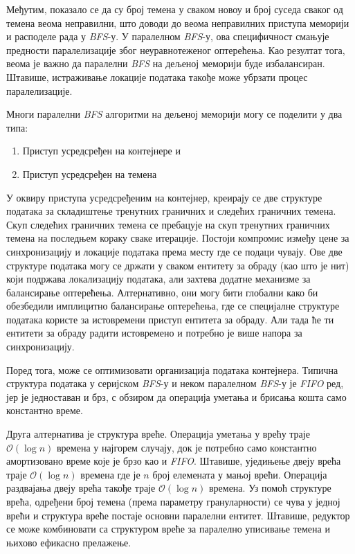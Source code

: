 \par
Међутим, показало се да су број темена у сваком новоу и број суседа сваког од темена веома неправилни, што доводи до веома неправилних приступа меморији и расподеле рада у \textit{BFS}-у. У паралелном \textit{BFS}-у, ова специфичност смањује предности паралелизације због неуравнотеженог оптерећења. Као резултат тога, веома је важно да паралелни \textit{BFS} на дељеној меморији буде избалансиран. Штавише, истраживање локације података такође може убрзати процес паралелизације.

\par
Многи паралелни \textit{BFS} алгоритми на дељеној меморији могу се поделити у два типа:
\begin{enumerate}
    \vspace{-5mm}
    \item Приступ усредсређен на контејнере и
    \item Приступ усредсређен на темена
\end{enumerate}
 
 \par
 У оквиру приступа усредсређеним на контејнер, креирају се две структуре података за складиштење тренутних граничних и следећих граничних темена. Скуп следећих граничних темена се пребацује на скуп тренутних граничних темена на последњем кораку сваке итерације. Постоји компромис између цене за синхронизацију и локације података према месту где се подаци чувају. Ове две структуре података могу се држати у сваком ентитету за обраду (као што је нит) који подржава локализацију података, али захтева додатне механизме за балансирање оптерећења. Алтернативно, они могу бити глобални како би обезбедили имплицитно балансирање оптерећења, где се специјалне структуре података користе за истовремени приступ ентитета за обраду. Али тада ће ти ентитети за обраду радити истовремено и потребно је више напора за синхронизацију.

\par
Поред тога, може се оптимизовати организација података контејнера. Типична структура података у серијском \textit{BFS}-у и неком паралелном \textit{BFS}-у је \textit{FIFO} ред, јер је једноставан и брз, с обзиром да операција уметања и брисања кошта само константно време.

\par
Друга алтернатива је структура вреће. Операција уметања у врећу траје $\mathcal{O}(\log{n})$ времена у најгорем случају, док је потребно само константно амортизовано време које је брзо као и \textit{FIFO}. Штавише, уједињење двеју врећа траје $\mathcal{O}(\log{n})$ времена где је $n$ број елемената у мањој врећи. Операција раздвајања двеју врећа такође траје $\mathcal{O}(\log{n})$ времена. Уз помоћ структуре врећа, одређени број темена (према параметру грануларности) се чува у једној врећи и структура вреће постаје основни паралелни ентитет. Штавише, редуктор се може комбиновати са структуром вреће за паралелно уписивање темена и њихово ефикасно прелажење.

